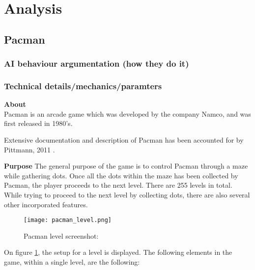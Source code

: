 
\section{Analysis} \label{sec:analysis}




\subsection{Pacman}
\subsubsection{AI behaviour argumentation (how they do it)}
\subsubsection{Technical details/mechanics/paramters}

\textbf{About}\\
Pacman is an arcade game which was developed by the company Namco, and was first released in 1980's.

Extensive documentation and description of Pacman has been accounted for by Pittmann, 2011 \cite{Pittman2011}.

\textbf{Purpose}
The general purpose of the game is to control Pacman through a maze while gathering dots. Once all the dots within the maze has been collected by Pacman, the player proceeds to the next level. There are 255 levels in total.\\

While trying to proceed to the next level by collecting dots, there are also several other incorporated features.

\begin{figure}[!h]
\centering
\texttt{[image: pacman\_level.png]}
\caption{Pacman level screenshot: \cite{Pittman2011} }
\label{fig:Pacman}
\end{figure}


On figure \ref{fig:Pacman}, the setup for a level is displayed. The following elements in the game, within a single level, are the following:

